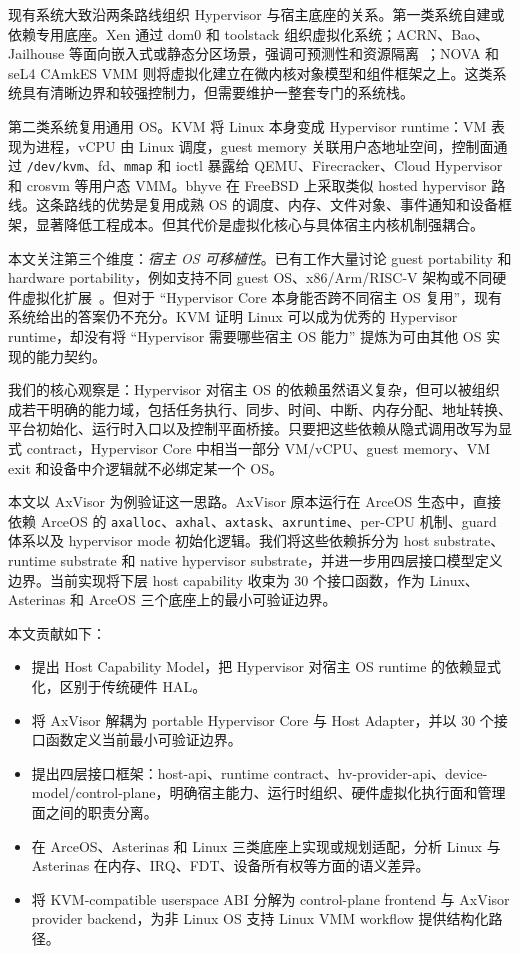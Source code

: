 \documentclass[a4paper,11pt]{article}
\begin{document}
现有系统大致沿两条路线组织 Hypervisor 与宿主底座的关系。第一类系统自建或依赖专用底座。Xen 通过 dom0 和 toolstack 组织虚拟化系统；ACRN、Bao、Jailhouse 等面向嵌入式或静态分区场景，强调可预测性和资源隔离~\cite{li2019acrn,martins2020lightweight,martins2023shedding}；NOVA 和 seL4 CAmkES VMM 则将虚拟化建立在微内核对象模型和组件框架之上。这类系统具有清晰边界和较强控制力，但需要维护一整套专门的系统栈。

第二类系统复用通用 OS。KVM 将 Linux 本身变成 Hypervisor runtime：VM 表现为进程，vCPU 由 Linux 调度，guest memory 关联用户态地址空间，控制面通过 \texttt{/dev/kvm}、fd、\texttt{mmap} 和 ioctl 暴露给 QEMU、Firecracker、Cloud Hypervisor 和 crosvm 等用户态 VMM。bhyve 在 FreeBSD 上采取类似 hosted hypervisor 路线。这条路线的优势是复用成熟 OS 的调度、内存、文件对象、事件通知和设备框架，显著降低工程成本。但其代价是虚拟化核心与具体宿主内核机制强耦合。

本文关注第三个维度：\emph{宿主 OS 可移植性}。已有工作大量讨论 guest portability 和 hardware portability，例如支持不同 guest OS、x86/Arm/RISC-V 架构或不同硬件虚拟化扩展~\cite{s2021first,sousa2024hspv}。但对于 ``Hypervisor Core 本身能否跨不同宿主 OS 复用''，现有系统给出的答案仍不充分。KVM 证明 Linux 可以成为优秀的 Hypervisor runtime，却没有将 ``Hypervisor 需要哪些宿主 OS 能力'' 提炼为可由其他 OS 实现的能力契约。

我们的核心观察是：Hypervisor 对宿主 OS 的依赖虽然语义复杂，但可以被组织成若干明确的能力域，包括任务执行、同步、时间、中断、内存分配、地址转换、平台初始化、运行时入口以及控制平面桥接。只要把这些依赖从隐式调用改写为显式 contract，Hypervisor Core 中相当一部分 VM/vCPU、guest memory、VM exit 和设备中介逻辑就不必绑定某一个 OS。

本文以 AxVisor 为例验证这一思路。AxVisor 原本运行在 ArceOS 生态中，直接依赖 ArceOS 的 \texttt{axalloc}、\texttt{axhal}、\texttt{axtask}、\texttt{axruntime}、per-CPU 机制、guard 体系以及 hypervisor mode 初始化逻辑。我们将这些依赖拆分为 host substrate、runtime substrate 和 native hypervisor substrate，并进一步用四层接口模型定义边界。当前实现将下层 host capability 收束为 30 个接口函数，作为 Linux、Asterinas 和 ArceOS 三个底座上的最小可验证边界。

本文贡献如下：

\begin{itemize}
  \item 提出 Host Capability Model，把 Hypervisor 对宿主 OS runtime 的依赖显式化，区别于传统硬件 HAL。
  \item 将 AxVisor 解耦为 portable Hypervisor Core 与 Host Adapter，并以 30 个接口函数定义当前最小可验证边界。
  \item 提出四层接口框架：host-api、runtime contract、hv-provider-api、device-model/control-plane，明确宿主能力、运行时组织、硬件虚拟化执行面和管理面之间的职责分离。
  \item 在 ArceOS、Asterinas 和 Linux 三类底座上实现或规划适配，分析 Linux 与 Asterinas 在内存、IRQ、FDT、设备所有权等方面的语义差异。
  \item 将 KVM-compatible userspace ABI 分解为 control-plane frontend 与 AxVisor provider backend，为非 Linux OS 支持 Linux VMM workflow 提供结构化路径。
\end{itemize}
\end{document}
